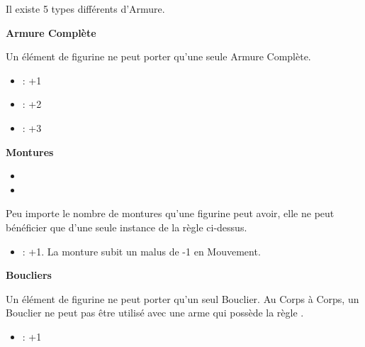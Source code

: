 Il existe 5 types différents d'Armure.

\begin{multicols}{2}
\begin{center}\noindent\textbf{Armure Complète}\end{center}

Un élément de figurine ne peut porter qu'une seule Armure Complète.

\noindent\begin{itemize}[label={-}, topsep=0cm, itemsep=0pt]
\item \la{} : +1
\item \ha{} : +2
\item \platearmour{} : +3
\end{itemize}

\begin{center}\noindent\textbf{Montures}\end{center}

\noindent\begin{itemize}[label={-}, topsep=0cm, itemsep=0pt]
\item {}
\item {}
\end{itemize}

Peu importe le nombre de montures qu'une figurine peut avoir, elle ne peut bénéficier que d'une seule instance de la règle ci-dessus.

\noindent\begin{itemize}[label={-}, topsep=0cm, itemsep=0pt]
\item \barding{} : +1. La monture subit un malus de -1 en Mouvement.
\end{itemize}

\columnbreak

\begin{center}\noindent\textbf{Boucliers}\end{center}

Un élément de figurine ne peut porter qu'un seul Bouclier. Au Corps à Corps, un Bouclier ne peut pas être utilisé avec une arme qui possède la règle \requirestwohands{}.

\noindent\begin{itemize}[label={-}, topsep=0cm, itemsep=0pt]
\item \shield{} : +1
\end{itemize}

\begin{center}\noindent\textbf{\newfromWHB{\innatedefence{}}}\end{center}


\end{multicols}
